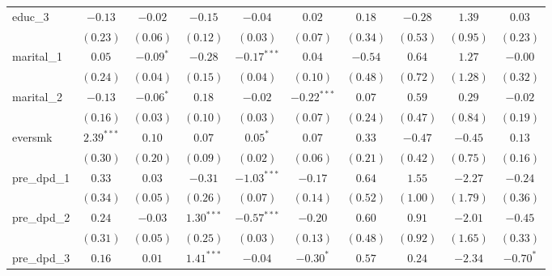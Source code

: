 \begin{tabular}{l c c c c c c c c c}
educ\_3          & $-0.13$       & $-0.02$       & $-0.15$       & $-0.04$       & $0.02$        & $0.18$         & $-0.28$       & $1.39$         & $0.03$         \\
                 & $(0.23)$      & $(0.06)$      & $(0.12)$      & $(0.03)$      & $(0.07)$      & $(0.34)$       & $(0.53)$      & $(0.95)$       & $(0.23)$       \\
marital\_1       & $0.05$        & $-0.09^{*}$   & $-0.28$       & $-0.17^{***}$ & $0.04$        & $-0.54$        & $0.64$        & $1.27$         & $-0.00$        \\
                 & $(0.24)$      & $(0.04)$      & $(0.15)$      & $(0.04)$      & $(0.10)$      & $(0.48)$       & $(0.72)$      & $(1.28)$       & $(0.32)$       \\
marital\_2       & $-0.13$       & $-0.06^{*}$   & $0.18$        & $-0.02$       & $-0.22^{***}$ & $0.07$         & $0.59$        & $0.29$         & $-0.02$        \\
                 & $(0.16)$      & $(0.03)$      & $(0.10)$      & $(0.03)$      & $(0.07)$      & $(0.24)$       & $(0.47)$      & $(0.84)$       & $(0.19)$       \\
eversmk          & $2.39^{***}$  & $0.10$        & $0.07$        & $0.05^{*}$    & $0.07$        & $0.33$         & $-0.47$       & $-0.45$        & $0.13$         \\
                 & $(0.30)$      & $(0.20)$      & $(0.09)$      & $(0.02)$      & $(0.06)$      & $(0.21)$       & $(0.42)$      & $(0.75)$       & $(0.16)$       \\
pre\_dpd\_1      & $0.33$        & $0.03$        & $-0.31$       & $-1.03^{***}$ & $-0.17$       & $0.64$         & $1.55$        & $-2.27$        & $-0.24$        \\
                 & $(0.34)$      & $(0.05)$      & $(0.26)$      & $(0.07)$      & $(0.14)$      & $(0.52)$       & $(1.00)$      & $(1.79)$       & $(0.36)$       \\
pre\_dpd\_2      & $0.24$        & $-0.03$       & $1.30^{***}$  & $-0.57^{***}$ & $-0.20$       & $0.60$         & $0.91$        & $-2.01$        & $-0.45$        \\
                 & $(0.31)$      & $(0.05)$      & $(0.25)$      & $(0.03)$      & $(0.13)$      & $(0.48)$       & $(0.92)$      & $(1.65)$       & $(0.33)$       \\
pre\_dpd\_3      & $0.16$        & $0.01$        & $1.41^{***}$  & $-0.04$       & $-0.30^{*}$   & $0.57$         & $0.24$        & $-2.34$        & $-0.70^{*}$    \\

\end{tabular}
